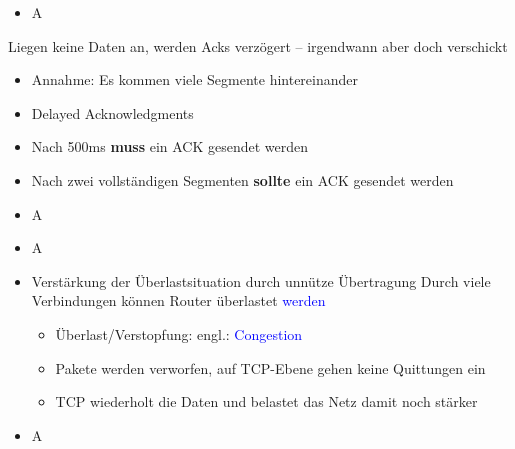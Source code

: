 \begin{itemize}
    \item \todo A
\end{itemize}

Liegen keine Daten an, werden
Acks verzögert – irgendwann aber
doch verschickt
\begin{itemize}
    \item Annahme: Es kommen viele Segmente hintereinander
    \item Delayed Acknowledgments
    \item Nach 500ms \textbf{muss} ein ACK gesendet werden
    \item Nach zwei vollständigen Segmenten \textbf{sollte} ein ACK gesendet werden
\end{itemize}

\begin{itemize}
    \item \todo A
\end{itemize}

\begin{itemize}
    \item \todo A
\end{itemize}

\begin{itemize}
    \item Verstärkung der Überlastsituation durch unnütze Übertragung
    Durch viele Verbindungen können Router überlastet \textcolor{blue}{werden}
    \begin{itemize}
        \item Überlast/Verstopfung: engl.: \textcolor{blue}{Congestion}
        \item Pakete werden verworfen, auf TCP-Ebene gehen keine Quittungen ein
        \item TCP wiederholt die Daten und belastet das Netz damit noch stärker
    \end{itemize}
\end{itemize}

\begin{itemize}
    \item \todo A
\end{itemize}

